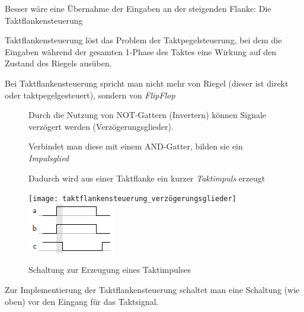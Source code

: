 \documentclass[12pt]{report}
\begin{document}
Besser wäre eine Übernahme der Eingaben an der steigenden Flanke: Die Taktflankensteuerung

\begin{defbox}[Taktflankensteuerung]
  Taktflankensteuerung löst das Problem der Taktpegelsteuerung, bei dem die Eingaben 
  während der gesamten 1-Phase des Taktes eine Wirkung auf den Zustand des Riegels ausüben.
  
  Bei Taktflankensteuerung spricht man nicht mehr von Riegel (dieser ist direkt oder taktpegelgesteuert), sondern von \textit{FlipFlop}
\end{defbox}

\begin{figure}[H]
  \begin{minipage}[t]{0.45\textwidth}
    Durch die Nutzung von NOT-Gattern (Invertern) können Signale verzögert werden (Verzögerungsglieder).
    
    Verbindet man diese mit einem AND-Gatter, bilden sie ein \textit{Impulsglied}
    
    Dadurch wird aus einer Taktflanke ein kurzer \textit{Taktimpuls} erzeugt
  \end{minipage}
  \hfill
  \begin{minipage}[t]{0.45\textwidth}
    \caption{Schaltung zur Erzeugung eines Taktimpulses}
    \centering
    \texttt{[image: taktflankensteuerung\_verzögerungsglieder]}
    \includegraphics{taktflankensteuerung_laufzeit}
  \end{minipage}
\end{figure}

Zur Implementierung der Taktflankensteuerung schaltet man eine Schaltung (wie oben) vor 
den Eingang für das Taktsignal.
\end{document}
